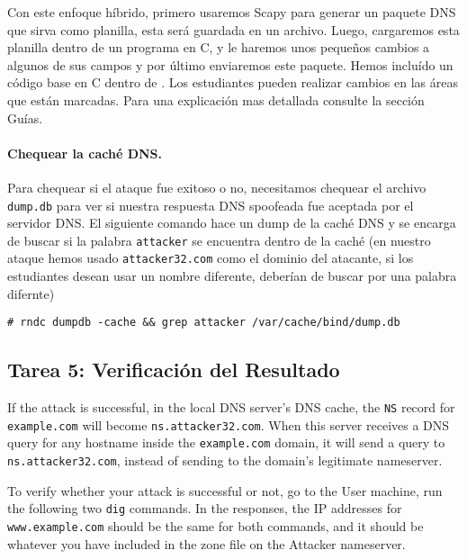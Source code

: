 Con este enfoque híbrido, primero usaremos Scapy para generar un paquete DNS que sirva como planilla, esta será guardada en un archivo.
Luego, cargaremos esta planilla dentro de un programa en C, y le haremos unos pequeños cambios a algunos de sus campos y por último enviaremos este paquete.
Hemos incluído un código base en C dentro de  . 
Los estudiantes pueden realizar cambios en las áreas que están marcadas. Para una explicación mas detallada consulte la sección Guías.



\paragraph{Chequear la caché DNS.}
Para chequear si el ataque fue exitoso o no, necesitamos chequear el archivo  {\tt dump.db} para ver si nuestra respuesta DNS spoofeada fue aceptada por el servidor DNS.
El siguiente comando hace un dump de la caché DNS y se encarga de buscar si la palabra \texttt{attacker} se encuentra dentro de la caché (en nuestro ataque hemos usado \texttt{attacker32.com} como el dominio del atacante, si los estudiantes desean usar un nombre diferente, deberían de buscar por una palabra difernte)

\begin{lstlisting}
# rndc dumpdb -cache && grep attacker /var/cache/bind/dump.db
\end{lstlisting}
 

\subsection{Tarea 5: Verificación del Resultado}

If the attack is successful, in the local DNS server's DNS cache, 
the {\tt NS} record for \texttt{example.com} will become 
\texttt{ns.attacker32.com}.
When this server receives a DNS query for any hostname
inside the \texttt{example.com} domain,  it will
send a query to \texttt{ns.attacker32.com}, instead of 
sending to the domain's legitimate nameserver. 


To verify whether your attack is successful or not, 
go to the User machine, run the following two
\texttt{dig} commands. In the responses, the IP addresses for 
\texttt{www.example.com} should be the same for both 
commands, and it should be whatever you have included
in the zone file on the Attacker nameserver. 

